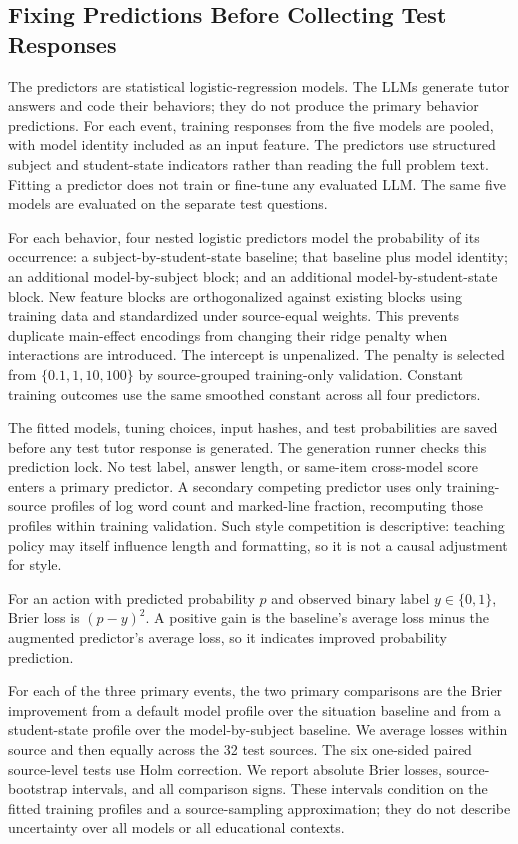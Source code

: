 \subsection{Fixing Predictions Before Collecting Test Responses}
\label{app:prediction-method}

The predictors are statistical logistic-regression models. The LLMs generate
tutor answers and code their behaviors; they do not produce the primary
behavior predictions. For each event, training responses from the five models
are pooled, with model identity included as an input feature. The
predictors use structured subject and student-state indicators rather than
reading the full problem text. Fitting a predictor does not train or fine-tune
any evaluated LLM. The same five models are evaluated on the separate
test questions.

For each behavior, four nested logistic predictors model the probability of its
occurrence: a subject-by-student-state baseline; that baseline plus model
identity; an additional model-by-subject block; and an additional
model-by-student-state block. New feature blocks are orthogonalized against
existing blocks using training data and standardized under source-equal
weights. This prevents duplicate main-effect encodings from changing their
ridge penalty when interactions are introduced. The intercept is unpenalized.
The penalty is selected from $\{0.1,1,10,100\}$ by source-grouped training-only
validation. Constant training outcomes use the same smoothed constant across
all four predictors.

The fitted models, tuning choices, input hashes, and test probabilities
are saved before any test tutor response is generated. The generation
runner checks this prediction lock. No test label, answer length, or
same-item cross-model score enters a primary predictor. A secondary competing
predictor uses only training-source profiles of log word count and marked-line
fraction, recomputing those profiles within training validation. Such style
competition is descriptive: teaching policy may itself influence length and
formatting, so it is not a causal adjustment for style.

For an action with predicted probability $p$ and observed binary label
$y\in\{0,1\}$, Brier loss is $(p-y)^2$. A positive gain is the baseline's
average loss minus the augmented predictor's average loss, so it indicates
improved probability prediction.

For each of the three primary events, the two primary comparisons are the Brier
improvement from a default model profile over the situation baseline and from a
student-state profile over the model-by-subject baseline. We average losses
within source and then equally across the 32 test sources. The six
one-sided paired source-level tests use Holm correction. We report absolute
Brier losses, source-bootstrap intervals, and all comparison signs. These
intervals condition on the fitted training profiles and a source-sampling
approximation; they do not describe uncertainty over all models or all
educational contexts.


